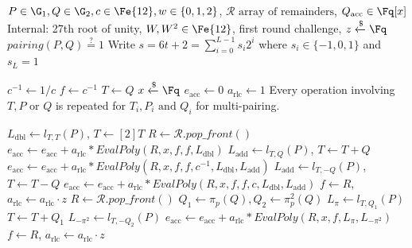 \begin{algorithm}
\caption{Pairing Verifier: Evaluating remainders}
\label{alg:2r:verifier}
\begin{algorithmic}[1]
\Require $P \in \G_1, Q \in \G_2, c \in \Fe{12}, w \in \{0,1,2\}$, $\mathcal{R} \text{ array of remainders}$, $Q_\text{acc} \in \Fq[x]$
\Statex Internal: 27th root of unity, $W, W^2 \in \Fe{12}$, first round challenge, $z \xleftarrow{\$} \Fq$
\Ensure $pairing(P, Q) \stackrel{?}{=} 1$
\Statex Write $s = 6t + 2 = \sum_{i=0}^{L-1} s_i 2^i$ where $s_i \in \{-1, 0, 1\}$ and $s_L = 1$

\State $c^{-1} \leftarrow 1 / c$ 
\State $f \leftarrow c^{-1}$ 
\State $T \leftarrow Q$ 
\State $x \xleftarrow{\$} \Fq$ 
\State $e_\text{acc} \leftarrow 0$ 
\State $a_\text{rlc} \leftarrow 1$ 
\color{gray}
\Statex \small{Every operation involving $T, P \text{ or } Q$ is repeated for $T_i, P_i \text{ and } Q_i$ for multi-pairing.}
\color{black}

\Statex
\Statex {}
    \State $L_\text{dbl} \leftarrow l_{T,T}(P)$, $T \leftarrow [2]T$
    \State $R \leftarrow \mathcal{R}.\textit{pop\_front}()$ 
		\State $e_\text{acc} \leftarrow e_\text{acc} + a_\text{rlc} * \textit{EvalPoly}(R, x, f, f, L_{\text{dbl}})$ 
        \State $L_\text{add} \leftarrow l_{T,Q}(P)$, $T \leftarrow T + Q$
        \State $e_\text{acc} \leftarrow e_\text{acc} + a_\text{rlc} * \textit{EvalPoly}(R, x, f, f, c^{-1}, L_\text{dbl}, L_\text{add})$ 
        \State $L_\text{add} \leftarrow l_{T,-Q}(P)$, $T \leftarrow T - Q$
        \State $e_\text{acc} \leftarrow e_\text{acc} + a_\text{rlc} * \textit{EvalPoly}(R, x, f, f, c, L_\text{dbl}, L_\text{add})$ 
    \EndIf
    \State $f \leftarrow R$, $a_\text{rlc} \leftarrow a_\text{rlc} \cdot z$ 
\EndFor
\Statex
\Statex {}
\State $R \leftarrow \mathcal{R}.\textit{pop\_front}()$ 
\State $Q_1 \leftarrow \pi_p(Q), Q_2 \leftarrow \pi_p^2(Q)$
\State $L_\pi \leftarrow l_{T,Q_1}(P)$
\State $T \leftarrow T + Q_1$
\State $L_{-\pi^2} \leftarrow l_{T,-Q_2}(P)$
\State $e_\text{acc} \leftarrow e_\text{acc} + a_\text{rlc} * \textit{EvalPoly}(R, x, f, L_\pi, L_{-\pi^2})$ 
\State $f \leftarrow R$, $a_\text{rlc} \leftarrow a_\text{rlc} \cdot z$ 


\end{algorithmic}
\end{algorithm}
